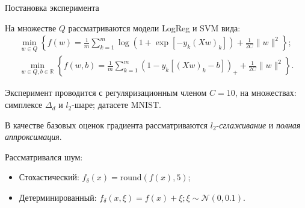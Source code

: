 \documentclass{beamer}
\begin{document}

\begin{frame}{Постановка эксперимента}

    На множестве $Q$ рассматриваются модели LogReg и SVM вида:
    \begin{align*}
        \min_{w \in Q} \left\{ f(w) = \frac{1}{m} \sum_{k = 1}^{m} \log \left( 1 + \exp \left[ -y_k (Xw)_k \right] \right) + \frac{1}{2C} \| w \|^2 \right\}; \\
        \min_{w \in Q, b \in \mathbb{R}} \left\{ f(w, b) = \frac{1}{m} \sum_{k = 1}^{m} \left( 1 - y_k [(Xw)_k - b] \right)_+ + \frac{1}{2C} \| w \|^2 \right\}.
    \end{align*}

    Эксперимент проводится с регуляризационным членом $C = 10$, на множествах: симплексе $\Delta_d$ и $l_2$-шаре; датасете MNIST.
    
    В качестве базовых оценок градиента рассматриваются $l_2$-\textit{сглаживание} и \textit{полная аппроксимация}.

    Рассматривался шум:
    \begin{itemize}
        \item Стохастический: $f_\delta(x) = \text{round}(f(x), 5)$;
        \item Детерминированный: $f_\delta(x, \xi) = f(x) + \xi; \xi \sim \mathcal{N}(0, 0.1)$.
    \end{itemize}

\end{frame}

\end{document}
